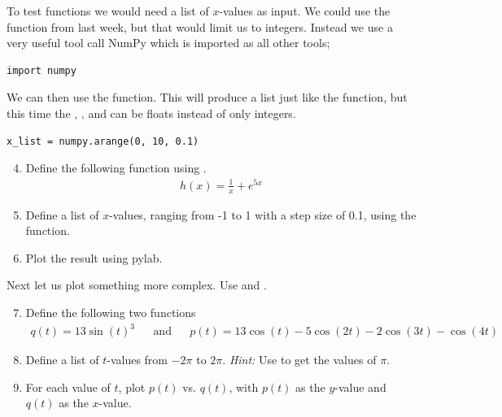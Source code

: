 \documentclass{article}
\begin{document}
To test functions we would need a list of $x$-values as input.
We could use the  function from last week, but that would limit us to
integers. Instead we use a very useful tool call NumPy which is imported as all other tools;

\begin{lstlisting}
import numpy
\end{lstlisting}

We can then use the  function.
This will produce a list just like the  function, but this time the
,
, and
can be floats instead of only integers.

\begin{lstlisting}
x_list = numpy.arange(0, 10, 0.1)
\end{lstlisting}

\begin{enumerate}
  \setcounter{enumi}{3}
  \item Define the following function using .
    \begin{align}
        h(x) = \frac{1}{x} + e^{5x}
    \end{align}

  \item Define a list of $x$-values, ranging from -1 to 1 with a step size of 0.1, using the  function.

  \item Plot the result using pylab.

\end{enumerate}

Next let us plot something more complex. Use  and .

\begin{enumerate}
  \setcounter{enumi}{6}
  \item Define the following two functions
    \begin{align}
        q(t) = 13\sin(t)^3 && \text{and} && p(t) = 13\cos(t) - 5 \cos(2t) - 2 \cos(3t) - \cos(4t)
    \end{align}

  \item Define a list of $t$-values from $-2\pi$ to $2\pi$.
      {\em Hint:} Use  to get the values of $\pi$.

  \item For each value of $t$, plot $p(t)$ vs. $q(t)$, with $p(t)$ as the $y$-value and $q(t)$ as the $x$-value.

\end{enumerate}
\end{document}
